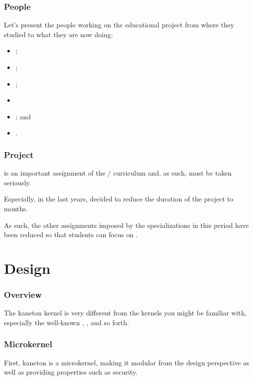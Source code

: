 
\begin{frame}
  \frametitle{People}

  Let's present the people working on the educational project from where they
  studied to what they are now doing:

  \begin{itemize}
    \item
      ;
    \item
      ;
    \item
      ;
    \item
    \item
      ; and
    \item
      .
  \end{itemize}
\end{frame}


\begin{frame}
  \frametitle{Project}

   is an important assignment of the /
  curriculum and, as such, must be taken seriously.

  \-

  Especially, in the last years,  decided to reduce the duration
  of the project to  months.

  \-

  As such, the other assignments imposed by the specializations in this
  period have been reduced so that students can focus on .
\end{frame}

%
%

\section{Design}


\begin{frame}
  \frametitle{Overview}

  The kaneton kernel is very different from the kernels you might be
  familiar with, especially the well-known , ,
   and so forth.
\end{frame}


\begin{frame}
  \frametitle{Microkernel}

  First, kaneton is a microkernel, making it modular from the design
  perspective as well as providing properties such as security.
\end{frame}

